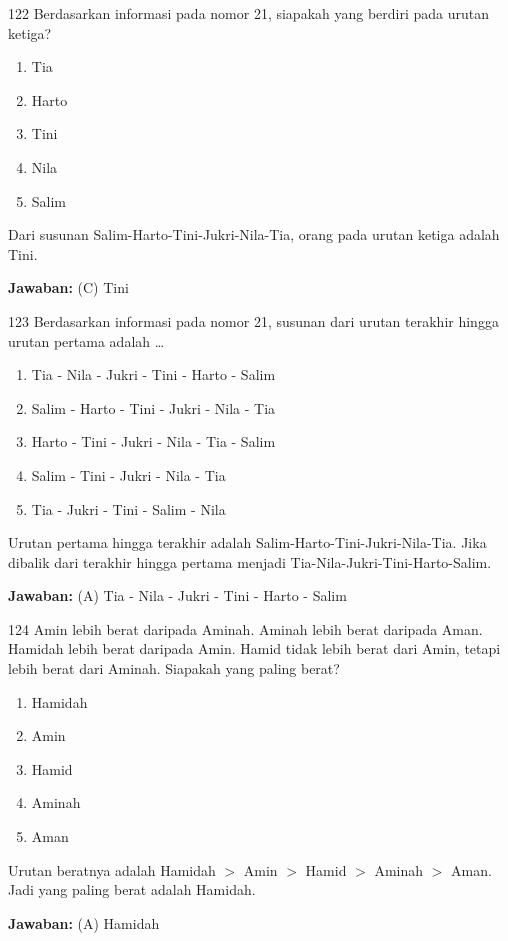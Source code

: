 \documentclass[11pt]{article}
\newenvironment{pil}{\begin{enumerate}[label=(\Alph*),leftmargin=*,itemsep=1pt,topsep=3pt]}{\end{enumerate}}
\newcommand{\jw}[1]{\par\smallskip\begin{jawbox}\textbf{Jawaban:} #1\end{jawbox}}
\begin{document}
\begin{soalbox}{1}{22}
Berdasarkan informasi pada nomor 21, siapakah yang berdiri pada urutan ketiga?
\begin{pil}\item Tia \item Harto \item Tini \item Nila \item Salim\end{pil}
\end{soalbox}
\begin{pembox}
Dari susunan Salim-Harto-Tini-Jukri-Nila-Tia, orang pada urutan ketiga adalah Tini.
\jw{(C) Tini}
\end{pembox}

\begin{soalbox}{1}{23}
Berdasarkan informasi pada nomor 21, susunan dari urutan terakhir hingga urutan pertama adalah \ldots
\begin{pil}\item Tia - Nila - Jukri - Tini - Harto - Salim \item Salim - Harto - Tini - Jukri - Nila - Tia \item Harto - Tini - Jukri - Nila - Tia - Salim \item Salim - Tini - Jukri - Nila - Tia \item Tia - Jukri - Tini - Salim - Nila\end{pil}
\end{soalbox}
\begin{pembox}
Urutan pertama hingga terakhir adalah Salim-Harto-Tini-Jukri-Nila-Tia. Jika dibalik dari terakhir hingga pertama menjadi Tia-Nila-Jukri-Tini-Harto-Salim.
\jw{(A) Tia - Nila - Jukri - Tini - Harto - Salim}
\end{pembox}

\begin{soalbox}{1}{24}
Amin lebih berat daripada Aminah. Aminah lebih berat daripada Aman. Hamidah lebih berat daripada Amin. Hamid tidak lebih berat dari Amin, tetapi lebih berat dari Aminah. Siapakah yang paling berat?
\begin{pil}\item Hamidah \item Amin \item Hamid \item Aminah \item Aman\end{pil}
\end{soalbox}
\begin{pembox}
Urutan beratnya adalah Hamidah $>$ Amin $>$ Hamid $>$ Aminah $>$ Aman. Jadi yang paling berat adalah Hamidah.
\jw{(A) Hamidah}
\end{pembox}
\end{document}
